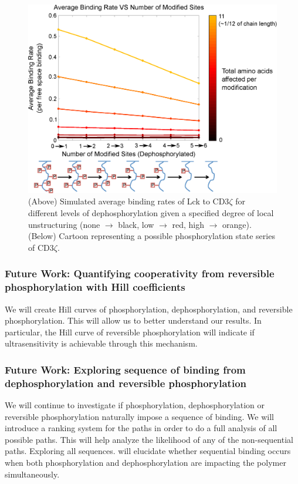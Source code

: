 \documentclass[../../AdvancementSummary.tex]{subfiles}
\begin{document}
\begin{figure}[H]
	\begin{center}
		\includegraphics[width=0.8\linewidth]{ResultsFigures/CD3ZetaStiffeningMembraneOn/Dephosphorylation/AvgBindVSTotalModified5.eps}
		\caption{(Above) Simulated average binding rates of Lck to CD3$\zeta$ for different levels of dephosphorylation given a specified degree of local unstructuring (none $\rightarrow$ black, low $\rightarrow$ red, high $\rightarrow$ orange). (Below) Cartoon representing a possible phosphorylation state series of CD3$\zeta$.\label{fig: DephosMemOnCoop}}
	\end{center}
\end{figure}


\subsubsection{Future Work: Quantifying cooperativity from reversible phosphorylation with Hill coefficients}

We will create Hill curves of phosphorylation, dephosphorylation, and reversible phosphorylation. This will allow us to better understand our results. In particular, the Hill curve of reversible phosphorylation will indicate if ultrasensitivity is achievable through this mechanism. 

\subsubsection{Future Work: Exploring sequence of binding from dephosphorylation and reversible phosphorylation}

We will continue to investigate if phosphorylation, dephosphorylation or reversible phosphorylation naturally impose a sequence of binding. We will introduce a ranking system for the paths in order to do a full analysis of all possible paths. This will help analyze the likelihood of any of the non-sequential paths. Exploring all sequences. will elucidate whether sequential binding occurs when both phosphorylation and dephosphorylation are impacting the polymer simultaneously. 
\end{document}

